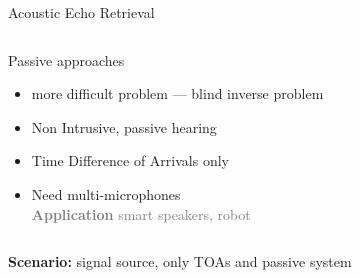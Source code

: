 \begin{frame}{Acoustic Echo Retrieval}
\begin{columns}[T,onlytextwidth]
{\begin{block}{Passive approaches}
                \vspace{-2mm}
                \begin{itemize}
                    \small
                    \item more difficult problem --- blind inverse problem
                    \item Non Intrusive, passive hearing
                    \item Time Difference of Arrivals only
                    \item Need multi-microphones
                    \\\hspace{-1em}\textcolor{gray}{\footnotesize \textbf{Application} smart speakers, robot}
                \end{itemize}
            \end{block}
        }
    \end{columns}

    \vfill
    \textcolor{myred}{\textbf{Scenario:} signal source, only TOAs and passive system}

\end{frame}

